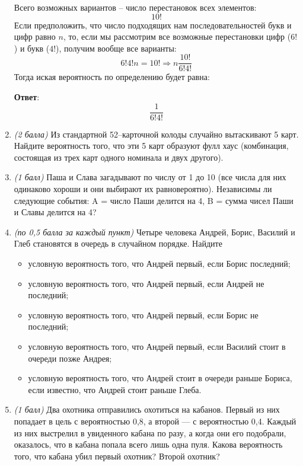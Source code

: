 \documentclass{article}
\begin{document}
\begin{enumerate}
    Всего возможных вариантов -- число перестановок всех элементов:
    \begin{equation}
        10!
    \end{equation}
    Если предположить, что число подходящих нам последовательностей букв и цифр равно $n$, то, если мы рассмотрим все возможные перестановки цифр ($6!$) и букв ($4!$), получим вообще все варианты:
    \begin{equation}
        6!4!n = 10! \Rightarrow n \frac{10!}{6!4!}
    \end{equation}
    Тогда иская вероятность по определению будет равна:

    \textbf{Ответ}:
    $$\dfrac{1}{6!4!}$$

    \item \textit{(2 балла)} Из стандартной 52–карточной колоды случайно вытаскивают 5 карт. Найдите вероятность того, что эти 5 карт образуют фулл хаус (комбинация, состоящая
    из трех карт одного номинала и двух другого).
    \item \textit{(1 балл)} Паша и Слава загадывают по числу от 1 до 10 (все числа для них одинаково
    хороши и они выбирают их равновероятно). Независимы ли следующие события:
    A = число Паши делится на 4,
    B = сумма чисел Паши и Славы делится на 4?
    \item \textit{(по 0,5 балла за каждый пункт)} Четыре человека Андрей, Борис, Василий и Глеб
    становятся в очередь в случайном порядке. Найдите
    \begin{itemize}
        \item условную вероятность того, что Андрей первый, если Борис последний;
        \item условную вероятность того, что Андрей первый, если Андрей не последний;
        \item условную вероятность того, что Андрей первый, если Борис не последний;
        \item условную вероятность того, что Андрей первый, если Василий стоит в очереди
        позже Андрея;
        \item условную вероятность того, что Андрей стоит в очереди раньше Бориса, если
        известно, что Андрей стоит раньше Глеба.
    \end{itemize}
    \item \textit{(1 балл)} Два охотника отправились охотиться на кабанов. Первый из них попадает в
    цель с вероятностью 0,8, а второй — с вероятностью 0,4. Каждый из них выстрелил
    в увиденного кабана по разу, а когда они его подобрали, оказалось, что в кабана
    попала всего лишь одна пуля. Какова вероятность того, что кабана убил первый
    охотник? Второй охотник?
  \end{enumerate}
\end{document}
